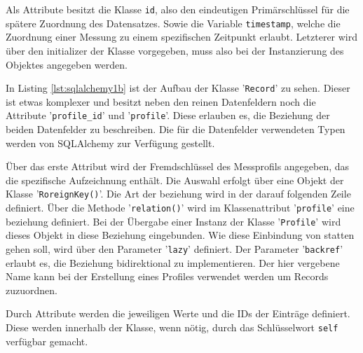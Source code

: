     Als Attribute besitzt die Klasse \texttt{id}, also den eindeutigen Primärschlüssel für die spätere Zuordnung des Datensatzes. Sowie die Variable \texttt{timestamp}, welche die Zuordnung einer Messung zu einem spezifischen Zeitpunkt erlaubt. Letzterer wird über den initializer der Klasse vorgegeben, muss also bei der Instanzierung des Objektes angegeben werden.
    
    
    
    In Listing \ref{lst:sqlalchemy1b} ist der Aufbau der Klasse '\texttt{Record}' zu sehen. Dieser ist etwas komplexer und besitzt neben den reinen Datenfeldern noch die Attribute '\texttt{profile\_id}' und '\texttt{profile}'. Diese erlauben es, die Beziehung der beiden Datenfelder zu beschreiben. Die für die Datenfelder verwendeten Typen werden von SQLAlchemy zur Verfügung gestellt.
    
    Über das erste Attribut wird der Fremdschlüssel des Messprofils angegeben, das die spezifische Aufzeichnung enthält. Die Auswahl erfolgt über eine Objekt der Klasse '\texttt{RoreignKey()}'. Die Art der beziehung wird in der darauf folgenden Zeile definiert. Über die Methode '\texttt{relation()}' wird im Klassenattribut '\texttt{profile}' eine beziehung definiert. Bei der Übergabe einer Instanz der Klasse '\texttt{Profile}' wird dieses Objekt in diese Beziehung eingebunden. Wie diese Einbindung von statten gehen soll, wird über den Parameter '\texttt{lazy}' definiert. Der Parameter '\texttt{backref}' erlaubt es, die Beziehung bidirektional zu implementieren. Der hier vergebene Name kann bei der Erstellung eines Profiles verwendet werden um Records zuzuordnen.
    
    
    Durch Attribute werden die jeweiligen Werte und die IDs der Einträge definiert.  Diese werden innerhalb der Klasse, wenn nötig, durch das Schlüsselwort \texttt{self} verfügbar gemacht.                                                                                                                                                                                                                                


